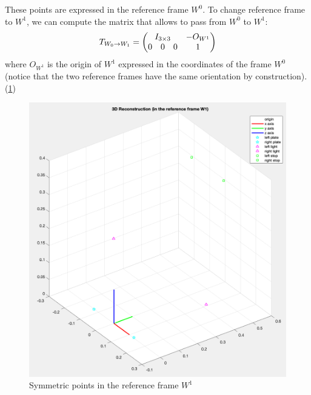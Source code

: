 \documentclass{article}
\begin{document}
These points are expressed in the reference frame $W^0$. To change reference frame to $W^1$, we can compute the matrix that allows to pass from $W^0$ to $W^1$:
$$ T_{W_0 \rightarrow W_1} = \begin{pmatrix} \multicolumn{3}{c}{I_{3 \times 3}} & -O_{W^1} \\
0 & 0 & 0 & 1
\end{pmatrix} $$
where $O_{W^1}$ is the origin of $W^1$ expressed in the coordinates of the frame $W^0$ (notice that the two reference frames have the same orientation by construction). (\ref{fig:3dreconstructionW1})
\begin{figure}[hbt!]
\centering
\includegraphics[scale=0.3]{images/3DreconstructionW1.png}
\caption{Symmetric points in the reference frame $W^1$}
\label{fig:3dreconstructionW1}
\end{figure}

\newpage
\end{document}
